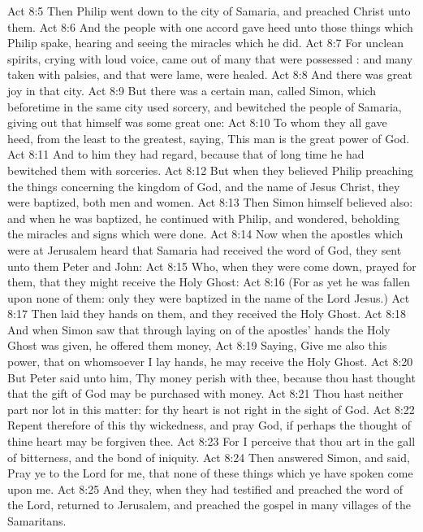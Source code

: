 \vs Act 8:5 Then Philip went down to the city of Samaria, and preached Christ unto them.
\vs Act 8:6 And the people with one accord gave heed unto those things which Philip spake, hearing and seeing the miracles which he did.
\vs Act 8:7 For unclean spirits, crying with loud voice, came out of many that were possessed : and many taken with palsies, and that were lame, were healed.
\vs Act 8:8 And there was great joy in that city.
\vs Act 8:9 But there was a certain man, called Simon, which beforetime in the same city used sorcery, and bewitched the people of Samaria, giving out that himself was some great one:
\vs Act 8:10 To whom they all gave heed, from the least to the greatest, saying, This man is the great power of God.
\vs Act 8:11 And to him they had regard, because that of long time he had bewitched them with sorceries.
\vs Act 8:12 But when they believed Philip preaching the things concerning the kingdom of God, and the name of Jesus Christ, they were baptized, both men and women.
\vs Act 8:13 Then Simon himself believed also: and when he was baptized, he continued with Philip, and wondered, beholding the miracles and signs which were done.
\vs Act 8:14 Now when the apostles which were at Jerusalem heard that Samaria had received the word of God, they sent unto them Peter and John:
\vs Act 8:15 Who, when they were come down, prayed for them, that they might receive the Holy Ghost:
\vs Act 8:16 (For as yet he was fallen upon none of them: only they were baptized in the name of the Lord Jesus.)
\vs Act 8:17 Then laid they  hands on them, and they received the Holy Ghost.
\vs Act 8:18 And when Simon saw that through laying on of the apostles' hands the Holy Ghost was given, he offered them money,
\vs Act 8:19 Saying, Give me also this power, that on whomsoever I lay hands, he may receive the Holy Ghost.
\vs Act 8:20 But Peter said unto him, Thy money perish with thee, because thou hast thought that the gift of God may be purchased with money.
\vs Act 8:21 Thou hast neither part nor lot in this matter: for thy heart is not right in the sight of God.
\vs Act 8:22 Repent therefore of this thy wickedness, and pray God, if perhaps the thought of thine heart may be forgiven thee.
\vs Act 8:23 For I perceive that thou art in the gall of bitterness, and  the bond of iniquity.
\vs Act 8:24 Then answered Simon, and said, Pray ye to the Lord for me, that none of these things which ye have spoken come upon me.
\vs Act 8:25 And they, when they had testified and preached the word of the Lord, returned to Jerusalem, and preached the gospel in many villages of the Samaritans.
